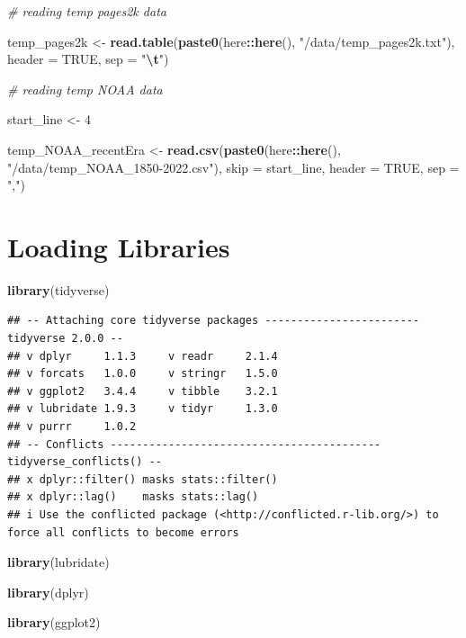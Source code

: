 \documentclass[
]{article}
\newenvironment{Shaded}{\begin{snugshade}}{\end{snugshade}}
\newcommand{\AttributeTok}[1]{\textcolor[rgb]{0.13,0.29,0.53}{#1}}
\newcommand{\CommentTok}[1]{\textcolor[rgb]{0.56,0.35,0.01}{\textit{#1}}}
\newcommand{\ConstantTok}[1]{\textcolor[rgb]{0.56,0.35,0.01}{#1}}
\newcommand{\DecValTok}[1]{\textcolor[rgb]{0.00,0.00,0.81}{#1}}
\newcommand{\FunctionTok}[1]{\textcolor[rgb]{0.13,0.29,0.53}{\textbf{#1}}}
\newcommand{\NormalTok}[1]{#1}
\newcommand{\OtherTok}[1]{\textcolor[rgb]{0.56,0.35,0.01}{#1}}
\newcommand{\SpecialCharTok}[1]{\textcolor[rgb]{0.81,0.36,0.00}{\textbf{#1}}}
\newcommand{\StringTok}[1]{\textcolor[rgb]{0.31,0.60,0.02}{#1}}
\begin{document}
\begin{Shaded}
\begin{Highlighting}[]
\CommentTok{\# reading temp pages2k data}

\NormalTok{temp\_pages2k }\OtherTok{\textless{}{-}} \FunctionTok{read.table}\NormalTok{(}\FunctionTok{paste0}\NormalTok{(here}\SpecialCharTok{::}\FunctionTok{here}\NormalTok{(), }\StringTok{"/data/temp\_pages2k.txt"}\NormalTok{), }\AttributeTok{header =} \ConstantTok{TRUE}\NormalTok{, }\AttributeTok{sep =} \StringTok{"}\SpecialCharTok{\textbackslash{}t}\StringTok{"}\NormalTok{)}

\CommentTok{\# reading temp NOAA data }

\NormalTok{start\_line }\OtherTok{\textless{}{-}} \DecValTok{4}

\NormalTok{temp\_NOAA\_recentEra }\OtherTok{\textless{}{-}} \FunctionTok{read.csv}\NormalTok{(}\FunctionTok{paste0}\NormalTok{(here}\SpecialCharTok{::}\FunctionTok{here}\NormalTok{(), }\StringTok{"/data/temp\_NOAA\_1850{-}2022.csv"}\NormalTok{), }\AttributeTok{skip =}\NormalTok{ start\_line, }\AttributeTok{header =} \ConstantTok{TRUE}\NormalTok{, }\AttributeTok{sep =} \StringTok{","}\NormalTok{)}
\end{Highlighting}
\end{Shaded}

\hypertarget{loading-libraries}{%
\section{Loading Libraries}\label{loading-libraries}}

\begin{Shaded}
\begin{Highlighting}[]
\FunctionTok{library}\NormalTok{(tidyverse)}
\end{Highlighting}
\end{Shaded}

\begin{verbatim}
## -- Attaching core tidyverse packages ------------------------ tidyverse 2.0.0 --
## v dplyr     1.1.3     v readr     2.1.4
## v forcats   1.0.0     v stringr   1.5.0
## v ggplot2   3.4.4     v tibble    3.2.1
## v lubridate 1.9.3     v tidyr     1.3.0
## v purrr     1.0.2     
## -- Conflicts ------------------------------------------ tidyverse_conflicts() --
## x dplyr::filter() masks stats::filter()
## x dplyr::lag()    masks stats::lag()
## i Use the conflicted package (<http://conflicted.r-lib.org/>) to force all conflicts to become errors
\end{verbatim}

\begin{Shaded}
\begin{Highlighting}[]
\FunctionTok{library}\NormalTok{(lubridate)}

\FunctionTok{library}\NormalTok{(dplyr)}

\FunctionTok{library}\NormalTok{(ggplot2)}
\end{Highlighting}
\end{Shaded}
\end{document}
